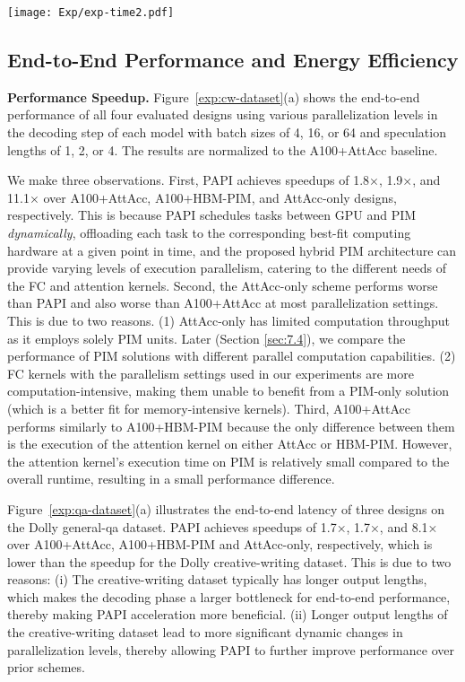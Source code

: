 \begin{figure*}[bp]

\centering
\texttt{[image: Exp/exp-time2.pdf]}
\caption{End-to-end speedup (top) and energy efficiency (bottom) comparisons of four evaluated designs on the Dolly creative-writing dataset. Values are normalized to A100+AttAcc.}
\label{exp:cw-dataset}

\end{figure*}

\subsection{End-to-End Performance and Energy Efficiency}
\label{sec:7.2}

\noindent\textbf{Performance Speedup.} Figure~\ref{exp:cw-dataset}(a) shows the end-to-end performance of all four evaluated designs using various parallelization levels in the decoding step of each model with batch sizes of 4, 16, or 64 and speculation lengths of 1, 2, or 4. The results are normalized to the A100+AttAcc baseline.

We make three observations. First, PAPI achieves speedups of 1.8×, 1.9×, and 11.1× over A100+AttAcc, A100+HBM-PIM, and AttAcc-only designs, respectively. This is because PAPI schedules tasks between GPU and PIM \emph{dynamically}, offloading each task to the corresponding best-fit computing hardware at a given point in time, and the proposed hybrid PIM architecture can provide varying levels of execution parallelism, catering to the different needs of the FC and attention kernels.
Second, the AttAcc-only scheme performs worse than PAPI and also worse than A100+AttAcc at most parallelization settings. This is due to two reasons. (1) AttAcc-only has limited computation throughput as it employs solely PIM units. Later (Section \ref{sec:7.4}), we compare the performance of PIM solutions with different parallel computation capabilities. 
(2) FC kernels with the parallelism settings used in our experiments are more computation-intensive, making them unable to benefit from a PIM-only solution (which is a better fit for memory-intensive kernels).
Third, A100+AttAcc performs similarly to A100+HBM-PIM because the only difference between them is the execution of the attention kernel on either AttAcc or HBM-PIM. However, the attention kernel's execution time on PIM is relatively small compared to the overall runtime, resulting in a small performance difference.


Figure~\ref{exp:qa-dataset}(a) illustrates the end-to-end latency of three designs on the Dolly general-qa dataset. PAPI achieves speedups of 1.7×, 1.7×, and 8.1× over A100+AttAcc, A100+HBM-PIM and AttAcc-only, respectively, which is lower than the speedup for the Dolly creative-writing dataset. This is due to two reasons:
(i) The creative-writing dataset typically has longer output lengths, which makes the decoding phase a larger bottleneck for end-to-end performance, thereby making PAPI acceleration more beneficial.
(ii) Longer output lengths of the creative-writing dataset lead to more significant dynamic changes in parallelization levels, thereby allowing PAPI to further improve performance over prior schemes.


